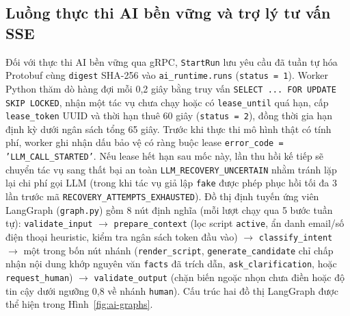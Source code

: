 \subsection{Luồng thực thi AI bền vững và trợ lý tư vấn SSE}
Đối với thực thi AI bền vững qua gRPC, \texttt{StartRun} lưu yêu cầu đã tuần tự hóa Protobuf cùng \texttt{digest} SHA-256 vào \texttt{ai\_\hspace{0pt}runtime.\hspace{0pt}runs} (\texttt{status = 1}).
Worker Python thăm dò hàng đợi mỗi 0,2 giây bằng truy vấn \texttt{SELECT ... FOR UPDATE SKIP LOCKED}, nhận một tác vụ chưa chạy hoặc có \texttt{lease\_\hspace{0pt}until} quá hạn, cấp \texttt{lease\_\hspace{0pt}token} UUID và thời hạn thuê 60 giây (\texttt{status = 2}), đồng thời gia hạn định kỳ dưới ngân sách tổng 65 giây.
Trước khi thực thi mô hình thật có tính phí, worker ghi nhận dấu bảo vệ có ràng buộc lease \texttt{error\_\hspace{0pt}code = 'LLM\_\hspace{0pt}CALL\_\hspace{0pt}STARTED'}.
Nếu lease hết hạn sau mốc này, lần thu hồi kế tiếp sẽ chuyển tác vụ sang thất bại an toàn \texttt{LLM\_\hspace{0pt}RECOVERY\_\hspace{0pt}UNCERTAIN} nhằm tránh lặp lại chi phí gọi LLM (trong khi tác vụ giả lập \texttt{fake} được phép phục hồi tối đa 3 lần trước mã \texttt{RECOVERY\_\hspace{0pt}ATTEMPTS\_\hspace{0pt}EXHAUSTED}).
Đồ thị định tuyến ứng viên LangGraph (\texttt{graph.\hspace{0pt}py}) gồm 8 nút định nghĩa (mỗi lượt chạy qua 5 bước tuần tự): \texttt{validate\_\hspace{0pt}input} $\rightarrow$ \texttt{prepare\_\hspace{0pt}context} (lọc script \texttt{active}, ẩn danh email/số điện thoại heuristic, kiểm tra ngân sách token đầu vào) $\rightarrow$ \texttt{classify\_\hspace{0pt}intent} $\rightarrow$ một trong bốn nút nhánh (\texttt{render\_\hspace{0pt}script}, \texttt{generate\_\hspace{0pt}candidate} chỉ chấp nhận nội dung khớp nguyên văn \texttt{facts} đã trích dẫn, \texttt{ask\_\hspace{0pt}clarification}, hoặc \texttt{request\_\hspace{0pt}human}) $\rightarrow$ \texttt{validate\_\hspace{0pt}output} (chặn biến ngoặc nhọn chưa điền hoặc độ tin cậy dưới ngưỡng 0,8 về nhánh \texttt{human}). Cấu trúc hai đồ thị LangGraph được thể hiện trong Hình~\ref{fig:ai-graphs}.

